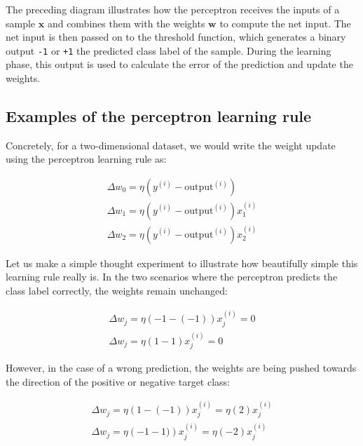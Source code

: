 \documentclass[11pt]{article}
\newcommand{\vect}[1]{\boldsymbol{#1}}
\begin{document}
    The preceding diagram illustrates how the perceptron receives the inputs of a sample $\vect{x}$ and combines them with the weights $\vect{w}$ to compute the net input.
    The net input is then passed on to the threshold function, which generates a binary output \texttt{-1} or \texttt{+1} \textemdash the predicted class label of the sample.
    During the learning phase, this output is used to calculate the error of the prediction and update the weights.

    \subsection{Examples of the perceptron learning rule} \label{subsec:perc_examples}

    Concretely, for a two-dimensional dataset, we would write the weight update using the perceptron learning rule as:

    \begin{equation}
        \label{eq:perc_2var_wupdate}
        \begin{gathered}
            \Delta w_0 = \eta \left( y^{(i)} - \text{output}^{(i)} \right) \\
            \Delta w_1 = \eta \left( y^{(i)} - \text{output}^{(i)} \right) x_1^{(i)} \\
            \Delta w_2 = \eta \left( y^{(i)} - \text{output}^{(i)} \right) x_2^{(i)}
        \end{gathered}
    \end{equation}

    Let us make a simple thought experiment to illustrate how beautifully simple this learning rule really is.
    In the two scenarios where the perceptron predicts the class label correctly, the weights remain unchanged:

    \begin{equation}
        \label{perc_correct}
        \begin{gathered}
            \Delta w_j = \eta \left( -1 - (-1) \right) x_j^{(i)} = 0\\
            \Delta w_j = \eta \left( 1 - 1 \right) x_j^{(i)} = 0
        \end{gathered}
    \end{equation}

    However, in the case of a wrong prediction, the weights are being pushed towards the direction of the positive or negative target class:

    \begin{equation}
        \label{perc_incorrect}
        \begin{gathered}
            \Delta w_j = \eta \left( 1 - (-1) \right) x_j^{(i)} = \eta \left( 2 \right) x_j^{(i)} \\
            \Delta w_j = \eta \left( -1 - 1) \right) x_j^{(i)} = \eta \left( - 2 \right) x_j^{(i)}
        \end{gathered}
    \end{equation}
\end{document}
